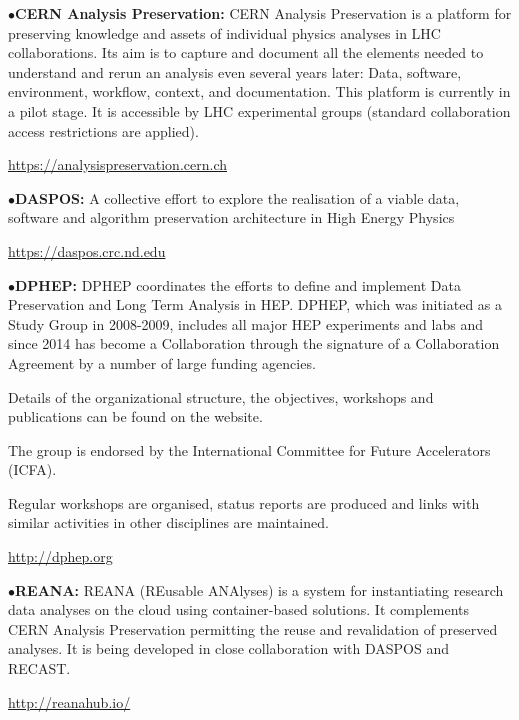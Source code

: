 \item{$\bullet$}{\bf CERN Analysis Preservation:} 
CERN Analysis Preservation is a platform for preserving knowledge and assets of individual physics analyses in LHC collaborations. Its aim is to capture and document all the elements needed to understand and rerun an analysis even several years later: Data, software, environment, workflow, context, and documentation. This platform is currently in a pilot stage. It is accessible by LHC experimental groups (standard collaboration access restrictions are applied).
	\item{}\qquad\url{https://analysispreservation.cern.ch}

\medskip

\item{$\bullet$}{\bf DASPOS:} 
A collective effort to explore the realisation of a viable data, software and algorithm preservation architecture in High Energy Physics
	\item{}\qquad\url{https://daspos.crc.nd.edu}


\medskip

\item{$\bullet$}{\bf DPHEP:} 
DPHEP coordinates the efforts to define and implement Data Preservation and Long Term Analysis in HEP. DPHEP, which was initiated as a Study Group in 2008-2009, includes all major HEP experiments and labs and since 2014 has become a Collaboration through the signature of a Collaboration Agreement by a number of large funding agencies. 

\item{}Details of the organizational structure, the objectives, workshops and publications can be found on the website. 

\item{}The group is endorsed by the International Committee for Future Accelerators (ICFA).

\item{}Regular workshops are organised, status reports are produced and links with similar activities in other disciplines are maintained.

	\item{}\qquad\url{http://dphep.org}

\medskip

\item{$\bullet$}{\bf REANA:} 
REANA (REusable ANAlyses) is a system for instantiating research data analyses on the cloud using container-based solutions. It complements CERN Analysis Preservation permitting the reuse and revalidation of preserved analyses. It is being developed in close collaboration with DASPOS and RECAST.
	\item{}\qquad\url{http://reanahub.io/}


